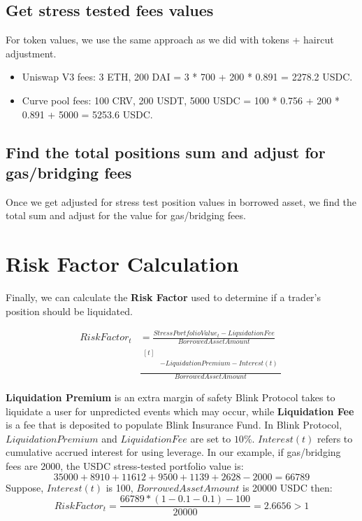 \documentclass[conference]{IEEEtran}
\begin{document}
\subsection{Get stress tested fees values}
 For token values, we use the same approach as we did with tokens + haircut adjustment. 
 \begin{itemize}
 	\item Uniswap V3 fees: 3 ETH, 200 DAI = 3 * 700 + 200 * 0.891 = 2278.2 USDC.
 	\item Curve pool fees: 100 CRV, 200 USDT, 5000 USDC = 100 * 0.756 + 200 * 0.891 + 5000 = 5253.6 USDC.
 \end{itemize}
 
 \subsection{Find the total positions sum and adjust for gas/bridging fees}
 
 Once we get adjusted for stress test position values in borrowed asset, we find the total sum and adjust for the value for gas/bridging fees.
 
 \section{Risk Factor Calculation}
 Finally, we can calculate the \textbf{Risk Factor} used to determine if a trader’s position should be liquidated. 
 
\begin{align}
RiskFactor_{t} &= \frac{StressPortfolioValue_{t}-LiquidationFee}{BorrowedAssetAmount} \nonumber \\
& \frac{\begin{aligned}[t] \\
  &-LiquidationPremium - Interest(t) \\
  \end{aligned}}{BorrowedAssetAmount} \nonumber \
\end{align}
 
 \textbf{Liquidation Premium} is an extra margin of safety Blink Protocol takes to liquidate a user for unpredicted events which may occur, while \textbf{Liquidation Fee} is a fee that is deposited to populate Blink Insurance Fund. In Blink Protocol, $LiquidationPremium$ and $LiquidationFee$ are set to $10\%$. $Interest(t)$ refers to cumulative accrued interest for using leverage. In our example, if gas/bridging fees are $2000$, the USDC stress-tested portfolio value is: 
 $$35000 + 8910 + 11612 + 9500 + 1139 + 2628 - 2000 = 66789$$
Suppose, $Interest(t)$ is 100, $BorrowedAssetAmount$ is 20000 USDC then:
$$RiskFactor_{t}=\frac{66789*(1-0.1-0.1)-100}{20000}=2.6656>1$$
\end{document}
